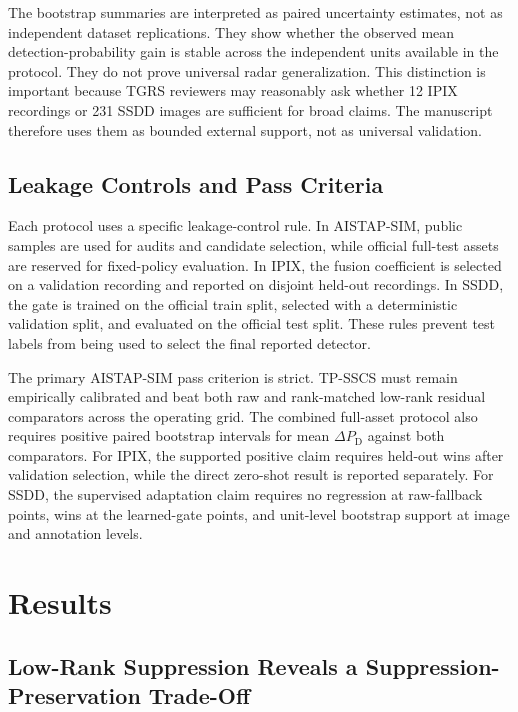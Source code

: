 \documentclass[journal]{IEEEtran}
\begin{document}
The bootstrap summaries are interpreted as paired uncertainty estimates, not as independent dataset replications. They show whether the observed mean detection-probability gain is stable across the independent units available in the protocol. They do not prove universal radar generalization. This distinction is important because TGRS reviewers may reasonably ask whether 12 IPIX recordings or 231 SSDD images are sufficient for broad claims. The manuscript therefore uses them as bounded external support, not as universal validation.

\subsection{Leakage Controls and Pass Criteria}

Each protocol uses a specific leakage-control rule. In AISTAP-SIM, public samples are used for audits and candidate selection, while official full-test assets are reserved for fixed-policy evaluation. In IPIX, the fusion coefficient is selected on a validation recording and reported on disjoint held-out recordings. In SSDD, the gate is trained on the official train split, selected with a deterministic validation split, and evaluated on the official test split. These rules prevent test labels from being used to select the final reported detector.

The primary AISTAP-SIM pass criterion is strict. TP-SSCS must remain empirically calibrated and beat both raw and rank-matched low-rank residual comparators across the operating grid. The combined full-asset protocol also requires positive paired bootstrap intervals for mean $\Delta P_{\mathrm{D}}$ against both comparators. For IPIX, the supported positive claim requires held-out wins after validation selection, while the direct zero-shot result is reported separately. For SSDD, the supervised adaptation claim requires no regression at raw-fallback points, wins at the learned-gate points, and unit-level bootstrap support at image and annotation levels.

\section{Results}

\subsection{Low-Rank Suppression Reveals a Suppression-Preservation Trade-Off}
\end{document}
